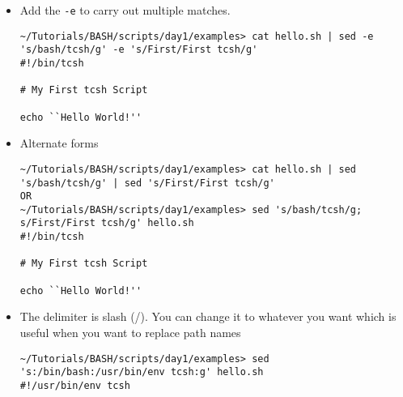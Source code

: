 \documentclass[10pt,t]{beamer}
\begin{document}
\begin{frame}
\begin{itemize}
\begin{columns}
\begin{center}
      \end{center} 
    \end{columns}
    \framebreak
    \item Add the \texttt{-e} to carry out multiple matches.
      \begin{lstlisting}[style=LINUX]
~/Tutorials/BASH/scripts/day1/examples> cat hello.sh | sed -e 's/bash/tcsh/g' -e 's/First/First tcsh/g'
#!/bin/tcsh

# My First tcsh Script

echo ``Hello World!''
      \end{lstlisting}
    \item Alternate forms
      \begin{lstlisting}[style=LINUX]
~/Tutorials/BASH/scripts/day1/examples> cat hello.sh | sed 's/bash/tcsh/g' | sed 's/First/First tcsh/g'
OR
~/Tutorials/BASH/scripts/day1/examples> sed 's/bash/tcsh/g; s/First/First tcsh/g' hello.sh 
#!/bin/tcsh

# My First tcsh Script

echo ``Hello World!''
      \end{lstlisting}
    \item The delimiter is slash (/). You can change it to whatever you want which is useful when you want to replace path names
      \begin{lstlisting}[style=LINUX]
~/Tutorials/BASH/scripts/day1/examples> sed 's:/bin/bash:/usr/bin/env tcsh:g' hello.sh 
#!/usr/bin/env tcsh


\end{lstlisting}
\end{itemize}
\end{frame}
\end{document}
